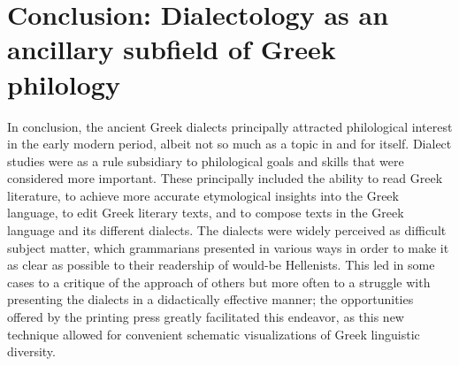 \section{Conclusion: Dialectology as an ancillary subfield of Greek philology}\label{sec:3.4}

In conclusion, the ancient Greek dialects principally attracted philological interest in the early modern period, albeit not so much as a topic in and for itself. Dialect studies were as a rule subsidiary to philological goals and skills that were considered more important. These principally included the ability to read Greek literature, to achieve more accurate etymological insights into the Greek language, to edit Greek literary texts, and to compose texts in the Greek language and its different dialects. The dialects were widely perceived as difficult subject matter, which grammarians presented in various ways in order to make it as clear as possible to their readership of would-be Hellenists. This led in some cases to a critique of the approach of others but more often to a struggle with presenting the dialects in a didactically effective manner; the opportunities offered by the printing press greatly facilitated this endeavor, as this new technique allowed for convenient schematic visualizations of Greek linguistic diversity.


